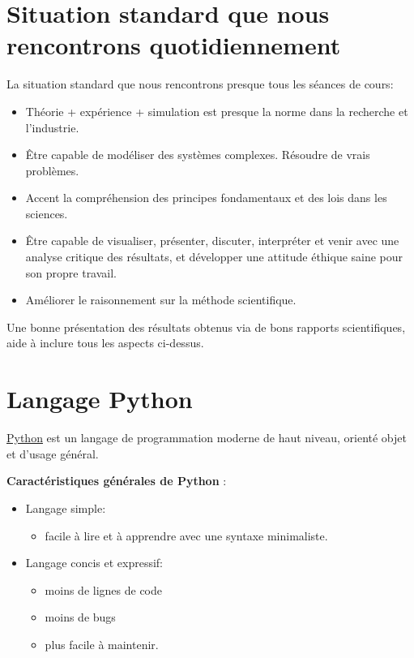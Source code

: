 \documentclass[%
oneside,                 %
final,                   %
10pt]{article}
\begin{document}
\section{Situation standard que nous rencontrons quotidiennement}

La situation standard que nous rencontrons presque tous les séances de cours:

\begin{itemize}
\item Théorie + expérience + simulation est presque la norme dans la recherche et l'industrie.

\item Être capable de modéliser des systèmes complexes. Résoudre de vrais problèmes.

\item Accent la compréhension des principes fondamentaux et des lois dans les sciences.

\item Être capable de visualiser, présenter, discuter, interpréter et venir avec une analyse critique des résultats, et développer une attitude éthique saine pour son propre travail.

\item Améliorer le raisonnement sur la méthode scientifique.
\end{itemize}

\noindent
Une bonne présentation des résultats obtenus via de bons rapports scientifiques, aide à inclure tous les aspects ci-dessus.

\section{Langage Python}

\href{{http://www.python.org/}}{Python} est un langage de programmation moderne de haut niveau, orienté objet et d'usage général.

\textbf{Caractéristiques générales de Python} :

\begin{itemize}
\item Langage simple:
\begin{itemize}

  \item facile à lire et à apprendre avec une syntaxe minimaliste.

\end{itemize}

\noindent
\item Langage concis et expressif:
\begin{itemize}

  \item moins de lignes de code

  \item moins de bugs

  \item plus facile à maintenir.
\end{itemize}

\noindent
\end{itemize}
\end{document}
